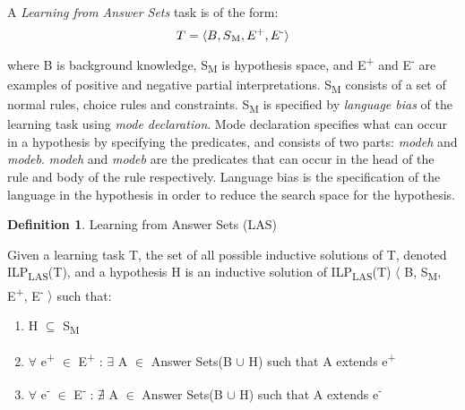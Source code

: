 \documentclass[12pt,twoside]{report}
\theoremstyle{plain}
\theoremstyle{definition}
\newtheorem{defn}[thm]{Definition} %
\newtheorem{examp}{Example}[section]
\begin{document}
A \textit{Learning from Answer Sets} task is of the form:
\begin{equation}
\begin{split}
T = \langle B, S\textsubscript{M}, E\textsuperscript{+}, E\textsuperscript{-} \rangle
\end{split}
\label{las}
\end{equation}
where B is background knowledge, S\textsubscript{M} is hypothesis space, and E\textsuperscript{+} and E\textsuperscript{-} are examples of positive and negative partial interpretations. S\textsubscript{M} consists of a set of normal rules, choice rules and constraints. 
S\textsubscript{M} is specified by \textit{language bias} of the learning task using \textit{mode declaration}. Mode declaration specifies what can occur in a hypothesis by specifying the predicates, and consists of two parts: \textit{modeh} and \textit{modeb}.  \textit{modeh} and \textit{modeb} are the predicates that can occur in the head of the rule and body of the rule respectively. Language bias is the specification of the language in the hypothesis in order to reduce the search space for the hypothesis.

\begin{defn}{Learning from Answer Sets (LAS)}

Given a learning task T, the set of all possible inductive solutions of T, denoted ILP\textsubscript{LAS}(T), and a hypothesis H is an inductive solution of ILP\textsubscript{LAS}(T) $\langle$ B, S\textsubscript{M}, E\textsuperscript{+}, E\textsuperscript{-} $\rangle$ such that:
\begin{enumerate}
\item H $\subseteq$ S\textsubscript{M}
\item $\forall$ e\textsuperscript{+} $\in$ E\textsuperscript{+} : $\exists$ A $\in$ Answer Sets(B $\cup$ H) such that A extends e\textsuperscript{+}
\item $\forall$ e\textsuperscript{-} $\in$ E\textsuperscript{-} : $\nexists$ A $\in$ Answer Sets(B $\cup$ H) such that A extends e\textsuperscript{-}
\end{enumerate}

\end{defn}


%
%
\end{document}
